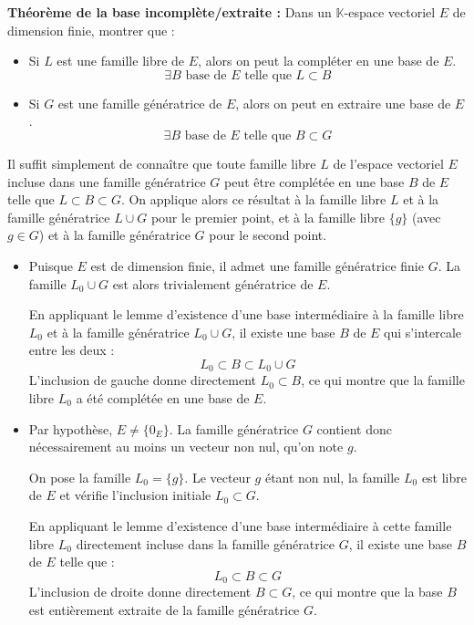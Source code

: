 \documentclass[11pt, a4paper]{article}
\theoremstyle{definition}
\begin{document}
\clearpage

\begin{tcolorbox}[instructionstyle]

\textbf{Théorème de la base incomplète/extraite :} Dans un $\mathbb K$-espace vectoriel $E$ de dimension finie, montrer que :
\begin{itemize}
    \item Si $L$ est une famille libre de $E$, alors on peut la compléter en une base de $E$.
\[
\exists B \text{ base de } E \text{ telle que } L \subset B
\]
    \item Si $G$ est une famille génératrice de $E$, alors on peut en extraire une base de $E$.
\[
\exists B \text{ base de } E \text{ telle que } B \subset G
\]
\end{itemize}
\end{tcolorbox}

\begin{tcolorbox}[methodstyle]
	Il suffit simplement de connaître que toute famille libre $L$ de l'espace vectoriel $E$ incluse dans une famille génératrice $G$ peut être complétée en une base $B$ de $E$ telle que $L \subset B \subset G$. On applique alors ce résultat à la famille libre $L$ et à la famille génératrice $L \cup G$ pour le premier point, et à la famille libre $\{g\}$ (avec $g \in G$) et à la famille génératrice $G$ pour le second point.
\end{tcolorbox}

\begin{itemize}
    \item[\textbf{1)}] Puisque $E$ est de dimension finie, il admet une famille génératrice finie $G$. La famille $L_0 \cup G$ est alors trivialement génératrice de $E$.
    
    En appliquant le lemme d'existence d'une base intermédiaire à la famille libre $L_0$ et à la famille génératrice $L_0 \cup G$, il existe une base $B$ de $E$ qui s'intercale entre les deux :
    \[ L_0 \subset B \subset L_0 \cup G \]
    L'inclusion de gauche donne directement $L_0 \subset B$, ce qui montre que la famille libre $L_0$ a été complétée en une base de $E$.
    
    \item[\textbf{2)}] Par hypothèse, $E \neq \{0_E\}$. La famille génératrice $G$ contient donc nécessairement au moins un vecteur non nul, qu'on note $g$.
    
    On pose la famille $L_0 = \{g\}$. Le vecteur $g$ étant non nul, la famille $L_0$ est libre de $E$ et vérifie l'inclusion initiale $L_0 \subset G$.
    
    En appliquant le lemme d'existence d'une base intermédiaire à cette famille libre $L_0$ directement incluse dans la famille génératrice $G$, il existe une base $B$ de $E$ telle que :
    \[ L_0 \subset B \subset G \]
    L'inclusion de droite donne directement $B \subset G$, ce qui montre que la base $B$ est entièrement extraite de la famille génératrice $G$.
\end{itemize}
\end{document}
